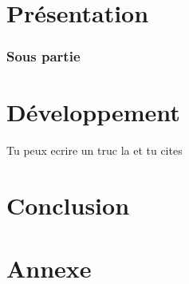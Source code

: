 \documentclass{article}
\begin{document}
\newpage

\renewcommand{\contentsname}{Table des matières} 
\tableofcontents
\newpage

\section{Présentation}
\subsubsection{Sous partie}

\section{Développement}

Tu peux ecrire un truc la et tu cites \cite{cours} \cite{einstein1935} \cite{leem} \cite{R} \cite{R} \cite{survivalanalysis} \cite{tg}

\section{Conclusion}

\newpage


\renewcommand{\refname}{Bibliographie}


\printbibliography



\newpage


\section*{Annexe}
\end{document}
